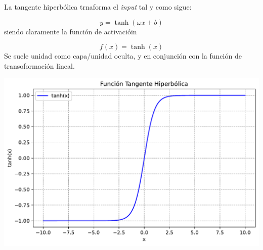 \begin{minipage}{0.45\linewidth} 

    La tangente hiperbólica trnaforma el \textit{input} tal y como sigue: 

    \begin{equation}
        y = \tanh (\omega x + b)
    \end{equation}
    siendo claramente la función de activacióin

    \begin{equation}
        f(x) = \tanh (x)
    \end{equation}
    Se suele unidad como capa/unidad oculta, y en conjunción con la función de transoformación lineal. 

\end{minipage} \hfill
\begin{minipage}{0.52\linewidth}
    \centering
    \includegraphics[width=1\linewidth]{Imagenes/03/Tanh.pdf}
\end{minipage}


